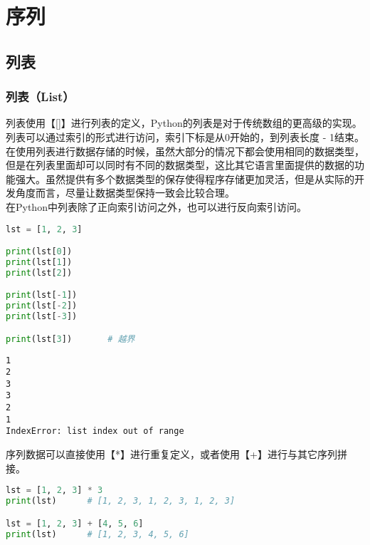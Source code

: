 \chapter{序列}

\section{列表}

\subsection{列表（List）}

列表使用【[]】进行列表的定义，Python的列表是对于传统数组的更高级的实现。列表可以通过索引的形式进行访问，索引下标是从0开始的，到列表长度 - 1结束。\\

在使用列表进行数据存储的时候，虽然大部分的情况下都会使用相同的数据类型，但是在列表里面却可以同时有不同的数据类型，这比其它语言里面提供的数据的功能强大。虽然提供有多个数据类型的保存使得程序存储更加灵活，但是从实际的开发角度而言，尽量让数据类型保持一致会比较合理。\\

在Python中列表除了正向索引访问之外，也可以进行反向索引访问。\\


\begin{lstlisting}[language=Python]
lst = [1, 2, 3]

print(lst[0])
print(lst[1])
print(lst[2])

print(lst[-1])
print(lst[-2])
print(lst[-3])

print(lst[3])       # 越界
\end{lstlisting}

\begin{tcolorbox}
	\begin{verbatim}
1
2
3
3
2
1
IndexError: list index out of range
\end{verbatim}
\end{tcolorbox}

序列数据可以直接使用【*】进行重复定义，或者使用【+】进行与其它序列拼接。\\


\begin{lstlisting}[language=Python]
lst = [1, 2, 3] * 3
print(lst)      # [1, 2, 3, 1, 2, 3, 1, 2, 3]

lst = [1, 2, 3] + [4, 5, 6]
print(lst)      # [1, 2, 3, 4, 5, 6]
\end{lstlisting}

